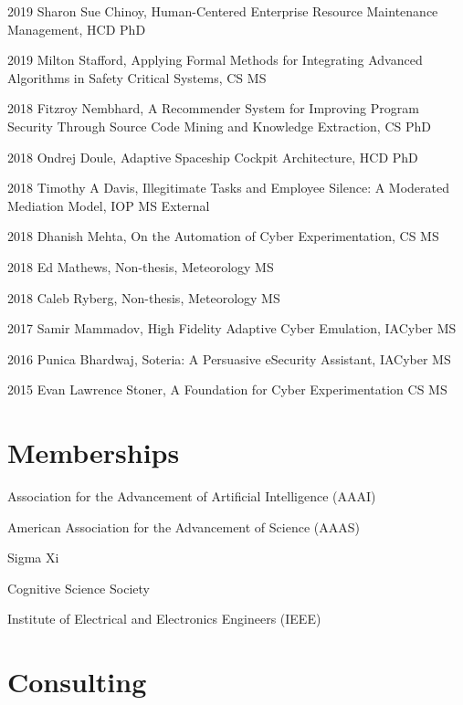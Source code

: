 \documentclass[12pt,letterpaper]{report}
\newcommand{\listitemspace}{0.25em}
\renewenvironment{itemize}
{\begin{list}{}{\setlength{\leftmargin}{0em}
                \setlength{\parskip}{0em}
                \setlength{\itemsep}{\listitemspace}
                \setlength{\parsep}{\listitemspace}}}
{\end{list}}
\begin{document}
\begin{itemize}
    \item 2019 Sharon Sue Chinoy, Human-Centered Enterprise Resource Maintenance Management, HCD PhD
    \item 2019 Milton Stafford, Applying Formal Methods for Integrating Advanced Algorithms in Safety Critical Systems, CS MS
    \item 2018 Fitzroy Nembhard, A Recommender System for Improving Program Security Through Source Code Mining and Knowledge Extraction, CS PhD
    \item 2018 Ondrej Doule, Adaptive Spaceship Cockpit Architecture, HCD PhD    
    \item 2018 Timothy A Davis, Illegitimate Tasks and Employee Silence: A Moderated Mediation Model, IOP MS External
    \item 2018 Dhanish Mehta, On the Automation of Cyber Experimentation, CS MS
    \item 2018 Ed Mathews, Non-thesis, Meteorology MS
    \item 2018 Caleb Ryberg, Non-thesis, Meteorology MS
    \item 2017 Samir Mammadov, High Fidelity Adaptive Cyber Emulation, IACyber MS
    \item 2016 Punica Bhardwaj, Soteria: A Persuasive eSecurity Assistant, IACyber MS
    \item 2015 Evan Lawrence Stoner, A Foundation for Cyber Experimentation CS MS

    \end{itemize}

    \section*{Memberships}

    \begin{itemize}
        \item Association for the Advancement of Artificial Intelligence (AAAI)
        \item American Association for the Advancement of Science (AAAS)
        \item Sigma Xi
        \item Cognitive Science Society
        \item Institute of Electrical and Electronics Engineers (IEEE)
    \end{itemize}



    \section*{Consulting}
\end{document}
